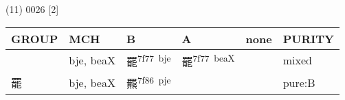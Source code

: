 \documentclass[14pt,a4paper]{scrartcl}
\begin{document}
(11) 0026 {[}2{]}

\begin{longtable}[c]{@{}llllll@{}}
\toprule
\begin{minipage}[b]{0.14\columnwidth}\raggedright\strut
GROUP
\strut\end{minipage} &
\begin{minipage}[b]{0.14\columnwidth}\raggedright\strut
MCH
\strut\end{minipage} &
\begin{minipage}[b]{0.14\columnwidth}\raggedright\strut
B
\strut\end{minipage} &
\begin{minipage}[b]{0.14\columnwidth}\raggedright\strut
A
\strut\end{minipage} &
\begin{minipage}[b]{0.14\columnwidth}\raggedright\strut
none
\strut\end{minipage} &
\begin{minipage}[b]{0.14\columnwidth}\raggedright\strut
PURITY
\strut\end{minipage}\tabularnewline
\midrule
\endhead
\begin{minipage}[t]{0.14\columnwidth}\raggedright\strut
𦋼
\strut\end{minipage} &
\begin{minipage}[t]{0.14\columnwidth}\raggedright\strut
bje, beaX
\strut\end{minipage} &
\begin{minipage}[t]{0.14\columnwidth}\raggedright\strut
罷\textsuperscript{7f77~bje}
\strut\end{minipage} &
\begin{minipage}[t]{0.14\columnwidth}\raggedright\strut
罷\textsuperscript{7f77~beaX}
\strut\end{minipage} &
\begin{minipage}[t]{0.14\columnwidth}\raggedright\strut
\strut\end{minipage} &
\begin{minipage}[t]{0.14\columnwidth}\raggedright\strut
mixed
\strut\end{minipage}\tabularnewline
\begin{minipage}[t]{0.14\columnwidth}\raggedright\strut
罷
\strut\end{minipage} &
\begin{minipage}[t]{0.14\columnwidth}\raggedright\strut
bje, beaX
\strut\end{minipage} &
\begin{minipage}[t]{0.14\columnwidth}\raggedright\strut
羆\textsuperscript{7f86~pje}
\strut\end{minipage} &
\begin{minipage}[t]{0.14\columnwidth}\raggedright\strut
\strut\end{minipage} &
\begin{minipage}[t]{0.14\columnwidth}\raggedright\strut
\strut\end{minipage} &
\begin{minipage}[t]{0.14\columnwidth}\raggedright\strut
pure:B
\strut\end{minipage}\tabularnewline
\bottomrule
\end{longtable}
\end{document}
